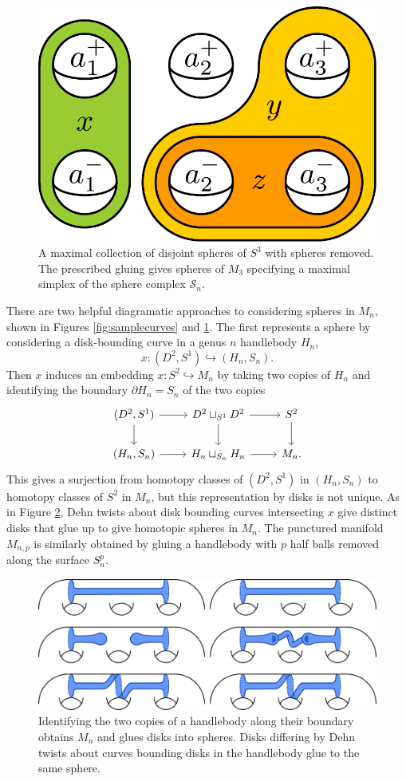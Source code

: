 \begin{figure}[h!]
  \centering
  \includegraphics[width=.3\textwidth]{figures/samplespheres.pdf}
  \caption{
  A maximal collection of disjoint spheres of $S^3$ with spheres removed.
  The prescribed gluing gives spheres of $M_3$
  specifying a maximal simplex of the sphere complex $\mathcal S_n$.
  }
  \label{fig:samplespheres}
\end{figure}

There are two helpful diagramatic approaches to considering
spheres in $M_{n}$, shown in Figures \ref{fig:samplecurves} and \ref{fig:samplespheres}.
The first represents a sphere by  considering
a disk-bounding curve in a genus $n$ handlebody $H_n$,
$$x: (D^2,S^1) \hookrightarrow (H_n, S_n).$$
Then $x$ induces an embedding $x:S^2 \hookrightarrow M_n$
by taking two copies of $H_n$ and identifying the boundary
$\partial H_n = S_n$ of the two copies
$$
\begin{tikzcd}
  (D^2,S^1) \arrow[r] \arrow[d] &
  D^2 \sqcup_{S^1} D^2 \arrow[r] \arrow[d] &
  S^2 \arrow[d]  \\
  (H_n,S_n) \arrow[r]&
  H_n \sqcup_{S_n} H_n \arrow[r] &
  M_n.
\end{tikzcd}
$$
This gives a surjection from homotopy classes
of $(D^2,S^1)$ in $(H_n,S_n)$ to homotopy classes of $S^2$ in $M_n$,
but this representation by disks is not unique.
As in Figure \ref{fig:spheredisk}, Dehn twists about disk bounding curves intersecting $x$ give
distinct disks that glue up to give homotopic spheres in $M_n$.
The punctured manifold $M_{n,p}$ is similarly obtained by gluing a handlebody with $p$ half balls removed along the surface $S^p_n$.

\begin{figure}[h!]
  \centering
  \includegraphics[width=\textwidth]{figures/spheredisk.pdf}
  \caption{
   Identifying the two copies of a handlebody along their boundary obtains $M_n$ and glues disks into spheres. Disks differing by Dehn twists about curves bounding disks in the handlebody glue to the same sphere.
  }
  \label{fig:spheredisk}
\end{figure}

